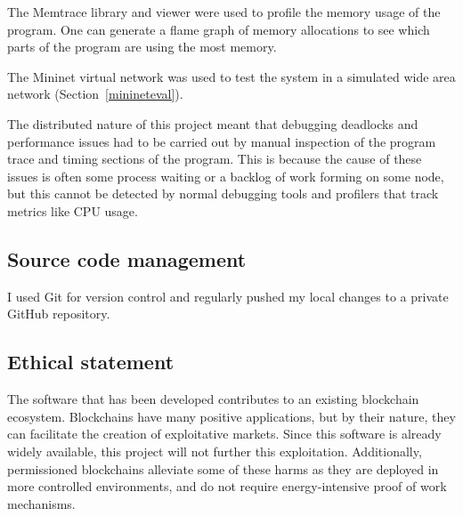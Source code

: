 The Memtrace library and viewer \cite{memtrace} were used to profile the memory usage of the program. One can generate a flame graph of memory allocations to see which parts of the program are using the most memory.

The Mininet virtual network \cite{mininet,lantzNetworkLaptopRapid2010} was used to test the system in a simulated wide area network (Section~\ref{minineteval}).

The distributed nature of this project meant that debugging deadlocks and performance issues had to be carried out by manual inspection of the program trace and timing sections of the program. This is because the cause of these issues is often some process waiting or a backlog of work forming on some node, but this cannot be detected by normal debugging tools and profilers that track metrics like CPU usage.

\subsection{Source code management}
I used Git for version control and regularly pushed my local changes to a private GitHub repository.

\subsection{Ethical statement}
The software that has been developed contributes to an existing blockchain ecosystem. Blockchains have many positive applications, but by their nature, they can facilitate the creation of exploitative markets. Since this software is already widely available, this project will not further this exploitation. Additionally, permissioned blockchains alleviate some of these harms as they are deployed in more controlled environments, and do not require energy-intensive proof of work mechanisms.